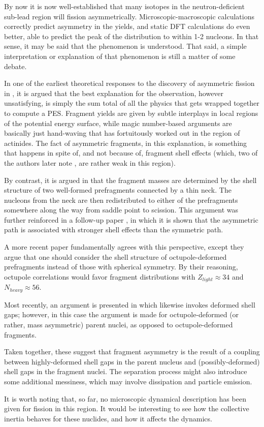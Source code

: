 By now it is now well-established that many isotopes in the neutron-deficient sub-lead region will fission asymmetrically. Microscopic-macroscopic calculations correctly predict asymmetry in the yields, and static DFT calculations do even better, able to predict the peak of the distribution to within 1-2 nucleons. In that sense, it may be said that the phenomenon is understood. That said, a simple interpretation or explanation of that phenomenon is still a matter of some debate.

In one of the earliest theoretical responses to the discovery of asymmetric fission in {\Hg} \cite{Moller2012}, it is argued that the best explanation for the observation, however unsatisfying, is simply the sum total of all the physics that gets wrapped together to compute a PES. Fragment yields are given by subtle interplays in local regions of the potential energy surface, while magic number-based arguments are basically just hand-waving that has fortuitously worked out in the region of actinides. The fact of asymmetric fragments, in this explanation, is something that happens in spite of, and not because of, fragment shell effects (which, two of the authors later note \cite{Ichikawa2012}, are rather weak in this region).

By contrast, it is argued in \cite{Warda2012a} that the fragment masses are determined by the shell structure of two well-formed prefragments connected by a thin neck. The nucleons from the neck are then redistributed to either of the prefragments somewhere along the way from saddle point to scission. This argument was further reinforced in a follow-up paper \cite{Mcdonnell2014}, in which it is shown that the asymmetric path is associated with stronger shell effects than the symmetric path.

A more recent paper \cite{Scamps2018a} fundamentally agrees with this perspective, except they argue that one should consider the shell structure of octupole-deformed prefragments instead of those with spherical symmetry. By their reasoning, octupole correlations would favor fragment distributions with $Z_{light}\approx34$ and $N_{heavy}\approx56$.

Most recently, an argument is presented in \cite{Ichikawa2019} which likewise invokes deformed shell gaps; however, in this case the argument is made for octupole-deformed (or rather, mass asymmetric) parent nuclei, as opposed to octupole-deformed fragments.

Taken together, these suggest that fragment asymmetry is the result of a coupling between highly-deformed shell gaps in the parent nucleus and (possibly-deformed) shell gaps in the fragment nuclei. The separation process might also introduce some additional messiness, which may involve dissipation and particle emission.

It is worth noting that, so far, no microscopic dynamical description has been given for fission in this region. It would be interesting to see how the collective inertia behaves for these nuclides, and how it affects the dynamics.

